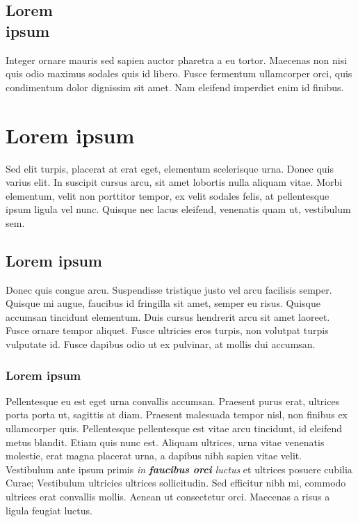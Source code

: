 \subsection{Lorem \\ ipsum}

Integer ornare mauris sed sapien auctor pharetra a eu tortor. Maecenas non nisi quis odio maximus sodales quis id libero. Fusce fermentum ullamcorper orci, quis condimentum dolor dignissim sit amet. Nam eleifend imperdiet enim id finibus.

\section{Lorem ipsum}

Sed elit turpis, placerat at erat eget, elementum scelerisque urna. Donec quis varius elit. In suscipit cursus arcu, sit amet lobortis nulla aliquam vitae. Morbi elementum, velit non porttitor tempor, ex velit sodales felis, at pellentesque ipsum ligula vel nunc. Quisque nec lacus eleifend, venenatis quam ut, vestibulum sem.

\subsection{Lorem ipsum}

Donec quis congue arcu. Suspendisse tristique justo vel arcu facilisis semper. Quisque mi augue, faucibus id fringilla sit amet, semper eu risus. Quisque accumsan tincidunt elementum. Duis cursus hendrerit arcu sit amet laoreet. Fusce ornare tempor aliquet. Fusce ultricies eros turpis, non volutpat turpis vulputate id. Fusce dapibus odio ut ex pulvinar, at mollis dui accumsan. 

\subsubsection{Lorem ipsum}

Pellentesque eu est eget urna convallis accumsan. Praesent purus erat, ultrices porta porta ut, sagittis at diam. Praesent malesuada tempor nisl, non finibus ex ullamcorper quis. Pellentesque pellentesque est vitae arcu tincidunt, id eleifend metus blandit. Etiam quis nunc est. Aliquam ultrices, urna vitae venenatis molestie, erat magna placerat urna, a dapibus nibh sapien vitae velit.
\\
Vestibulum ante ipsum primis \textit{in \textbf{faucibus orci} luctus} et ultrices posuere cubilia Curae; Vestibulum ultricies ultrices sollicitudin. Sed efficitur nibh mi, commodo ultrices erat convallis mollis. Aenean ut consectetur orci. Maecenas a risus a ligula feugiat luctus. 

